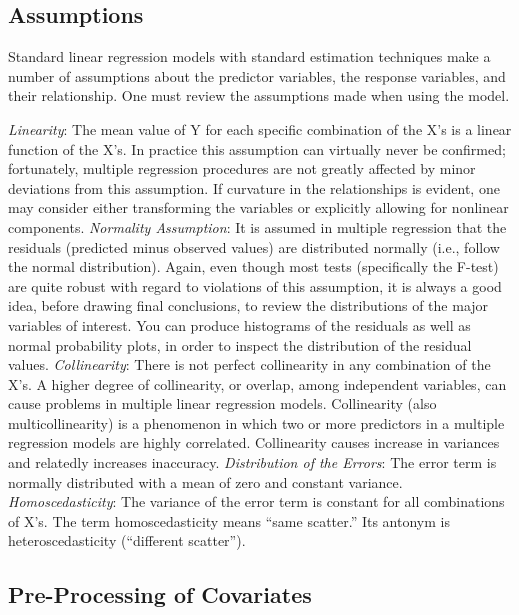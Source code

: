 \documentclass[10pt,b5paper,]{book}
\theoremstyle{definition}
\theoremstyle{definition}
\theoremstyle{definition}
\theoremstyle{remark}
\begin{document}
\hypertarget{assumptions}{%
\subsection{Assumptions}\label{assumptions}}

Standard linear regression models with standard estimation techniques
make a number of assumptions about the predictor variables, the response
variables, and their relationship. One must review the assumptions made
when using the model.

\emph{Linearity}: The mean value of Y for each specific combination of
the X's is a linear function of the X's. In practice this assumption can
virtually never be confirmed; fortunately, multiple regression
procedures are not greatly affected by minor deviations from this
assumption. If curvature in the relationships is evident, one may
consider either transforming the variables or explicitly allowing for
nonlinear components. \emph{Normality Assumption}: It is assumed in
multiple regression that the residuals (predicted minus observed values)
are distributed normally (i.e., follow the normal distribution). Again,
even though most tests (specifically the F-test) are quite robust with
regard to violations of this assumption, it is always a good idea,
before drawing final conclusions, to review the distributions of the
major variables of interest. You can produce histograms of the residuals
as well as normal probability plots, in order to inspect the
distribution of the residual values. \emph{Collinearity}: There is not
perfect collinearity in any combination of the X's. A higher degree of
collinearity, or overlap, among independent variables, can cause
problems in multiple linear regression models. Collinearity (also
multicollinearity) is a phenomenon in which two or more predictors in a
multiple regression models are highly correlated. Collinearity causes
increase in variances and relatedly increases inaccuracy.
\emph{Distribution of the Errors}: The error term is normally
distributed with a mean of zero and constant variance.
\emph{Homoscedasticity}: The variance of the error term is constant for
all combinations of X's. The term homoscedasticity means ``same
scatter.'' Its antonym is heteroscedasticity (``different scatter'').

\hypertarget{pre-processing-of-covariates}{%
\subsection{Pre-Processing of
Covariates}\label{pre-processing-of-covariates}}
\end{document}
